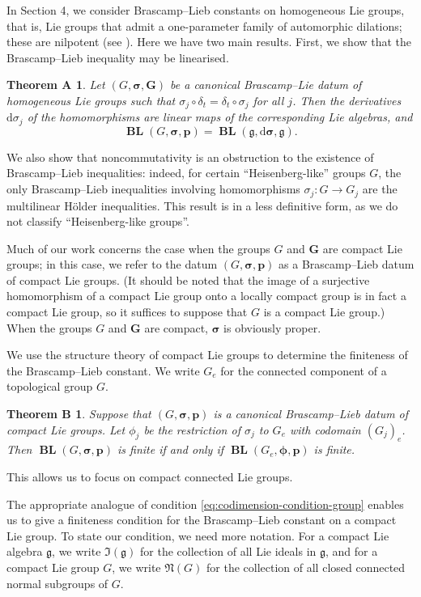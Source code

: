 \documentclass[12pt,twoside,a4paper]{amsart}
\newtheorem*{thmA}{Theorem A}
\newtheorem*{thmB}{Theorem B}
\theoremstyle{definition}
\theoremstyle{remark}
\numberwithin{equation}{section}
\newcommand{\Lie}[1]{\mathfrak{#1}}
\newcommand{\BL}{\operatorname{\mathbf{BL}}}
\newcommand{\bss}{\boldsymbol{\sigma}}
\newcommand{\bsDs}{\boldsymbol{\mathrm{d}\sigma}}
\newcommand{\bsphi}{\boldsymbol{\phi}}
\newcommand{\bsp}{\boldsymbol{p}}
\newcommand{\bsg}{\boldsymbol{\Lie{g}}}
\newcommand{\bsG}{\boldsymbol{G}}
\begin{document}
In Section 4, we consider Brascamp--Lieb constants on homogeneous Lie groups, that is, Lie groups that admit a one-parameter family of automorphic dilations; these are nilpotent (see \cite{Sie86}). 
Here we have two main results.
First, we show  that the Brascamp--Lieb inequality may be linearised.
\begin{thmA}
Let $(G, \bss, \bsG)$ be a canonical Brascamp--Lie datum of homogeneous Lie groups such that $\sigma_j \circ \delta_t = \delta_t \circ \sigma_j$ for all $j$.
Then the derivatives $\mathrm{d}\sigma_j$ of the homomorphisms are linear maps of the corresponding Lie algebras, and 
\[
\BL(G,\bss,\bsp) = \BL(\Lie{g}, \bsDs, \bsg).
\]
\end{thmA}

We also show that noncommutativity is an obstruction to the existence of Brascamp--Lieb inequalities: indeed, for certain ``Heisenberg-like'' groups $G$, the only Brascamp--Lieb inequalities involving homomorphisms $\sigma_j \colon G \to G_j$ are the multilinear Hölder inequalities.  
This result is in a less definitive form, as we do not classify ``Heisenberg-like groups''.


Much of our work concerns the case when the groups $G$ and $\bsG$ are compact Lie groups; in this case, we refer to the datum $(G, \bss, \bsp)$ as a Brascamp--Lieb datum of compact Lie groups.
(It should be noted that the image of a surjective homomorphism of a compact Lie group onto a locally compact group is in fact a compact Lie group, so it suffices to suppose that $G$ is a compact Lie group.)
When the groups $G$ and $\bsG$ are compact, $\bss$ is obviously proper.



We use the structure theory of compact Lie groups to determine the finiteness of the Brascamp--Lieb constant.
We write $G_e$ for the connected component of a topological group $G$.

\begin{thmB}%
Suppose that  $(G, \bss,\bsp)$ is a canonical Brascamp--Lieb datum of compact Lie groups. 
Let $\phi_j$ be the restriction of $\sigma_j$ to $G_e$ with codomain $(G_j)_e$. 
Then  $\BL(G, \bss, \bsp)$ is finite if and only if $\BL(G_e, \bsphi, \bsp)$ is finite.
\end{thmB}

This allows us to focus on compact connected Lie groups. 

The appropriate analogue of condition \eqref{eq:codimension-condition-group} enables us to give a finiteness condition for the Brascamp--Lieb constant on a compact Lie group.
To state our condition, we need more notation.
For a compact Lie algebra $\Lie{g}$, we write $\Lie{I}(\Lie{g})$ for the collection of all Lie ideals in $\Lie{g}$, and for a compact Lie group $G$, we write $\Lie{N}(G)$ for the collection of all closed connected normal subgroups of $G$.
\end{document}
